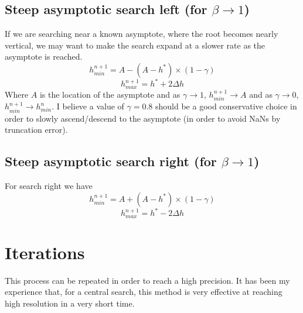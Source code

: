 \documentclass[11pt]{article}
\begin{document}
\subsection{Steep asymptotic search left (for $\beta \rightarrow 1$)}
If we are searching near a known asymptote, where the root becomes nearly vertical, we may want to make the search expand at a slower rate as the asymptote is reached.
\begin{equation}
	h_{min}^{n+1}=A-(A-h^*)\times(1-\gamma)
\end{equation}
\begin{equation}
	h_{max}^{n+1} = h^*+2\Delta h
\end{equation}
Where $A$ is the location of the asymptote and as $\gamma \rightarrow 1$, $h_{min}^{n+1} \rightarrow A$ and as $\gamma \rightarrow 0$, $h_{min}^{n+1} \rightarrow h_{min}^{n}$. I believe a value of $\gamma = 0.8$ should be a good conservative choice in order to slowly ascend/descend to the asymptote (in order to avoid NaNs by truncation error).

\subsection{Steep asymptotic search right (for $\beta \rightarrow 1$)}
For search right we have
\begin{equation}
	h_{min}^{n+1}=A+(A-h^*)\times(1-\gamma)
\end{equation}
\begin{equation}
	h_{max}^{n+1} = h^*-2\Delta h
\end{equation}

\section{Iterations}
This process can be repeated in order to reach a high precision. It has been my experience that, for a central search, this method is very effective at reaching high resolution in a very short time.
\end{document}
